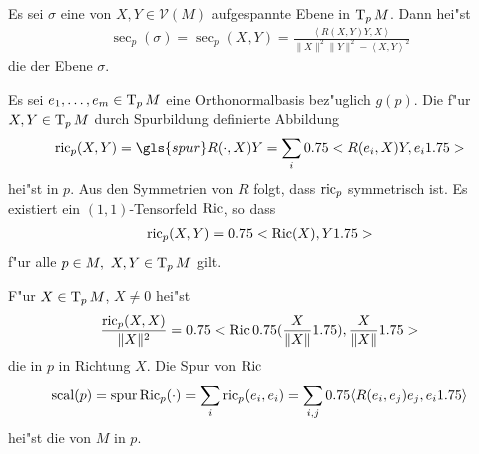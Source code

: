 \begin{Dfn}
  Es sei $\sigma$ eine von $X,Y \in \mathcal V(M)$ aufgespannte Ebene in $\operatorname{T}_pM$.
  Dann hei"st 
  \begin{align*}
    \sec_p(\sigma) = \sec_p(X,Y) = \frac{\left<R(X,Y)Y,X\right>}{\|X\|^2\|Y\|^2 - \left<X,Y\right>^2}
  \end{align*}
  die  der Ebene $\sigma$.
\end{Dfn}



Es sei $e_1, \ldots, e_m \in  \operatorname{T}_pM$ eine Orthonormalbasis bez"uglich $g(p)$. Die f"ur $X,Y \in \operatorname{T}_pM$ durch Spurbildung definierte Abbildung
\begin{align*}
  \ric_p(X,Y) = \gls{spur} R(\cdot,X)Y = \sum_i\left<R(e_i,X)Y,e_i\right>
\end{align*}
hei"st  in $p$. Aus den Symmetrien von $R$ folgt, dass $\operatorname{ric}_p$ symmetrisch ist.
Es existiert ein $(1,1)$-Tensorfeld $\operatorname{Ric}$, so dass
\begin{align*}
  \operatorname{ric}_p(X,Y) = 0.75<\operatorname{Ric}(X),Y1.75>
\end{align*}
f"ur alle $p \in M, \ X,Y \in \operatorname{T}_pM$ gilt.

\begin{Dfn}
  F"ur $X \in \operatorname{T}_pM$, $X \neq 0$ hei"st
  \begin{align*}
    \frac{\operatorname{ric}_p(X,X)}{\|X\|^2} = 0.75<\operatorname{Ric}0.75(\frac{X}{\|X\|}1.75),\frac{X}{\|X\|}1.75>
  \end{align*}
  die  in $p$ in Richtung $X$. Die Spur von $\operatorname{Ric}$
  \begin{align*}
    \operatorname{scal}(p) = \operatorname{spur} \operatorname{Ric}_p(\cdot) = \sum_i \operatorname{ric}_p(e_i,e_i) = \sum_{i,j} 0.75\langle R(e_i,e_j)e_j,e_i 1.75\rangle
  \end{align*}
  hei"st die  von $M$ in $p$.
\end{Dfn}


